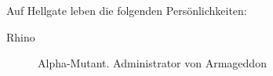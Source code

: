 
Auf Hellgate leben die folgenden Persönlichkeiten: 

\begin{description}    
    \item[Rhino] Alpha-Mutant. Administrator von Armageddon
\end{description}
